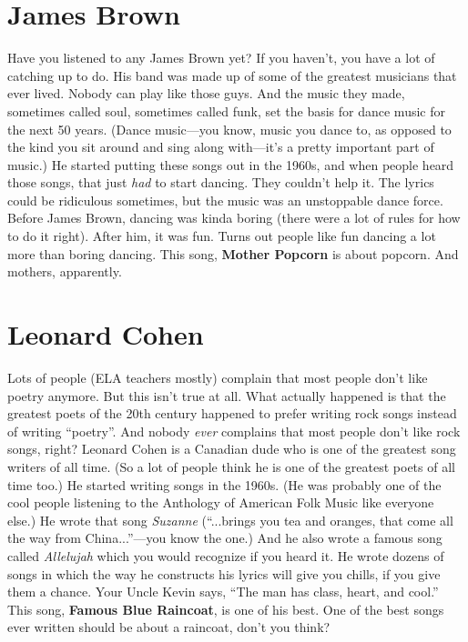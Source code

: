 \documentclass[letterpaper,single]{article}
\begin{document}
\section{James Brown}
Have you listened to any James Brown yet? 
If you haven't, you have a lot of catching up to do. 
His band was made up of some of the greatest musicians that ever lived. 
Nobody can play like those guys. 
And the music they made, sometimes called soul, sometimes called funk, set the basis for dance music for the next 50 years. 
(Dance music---you know, music you dance to, as opposed to the kind you sit around and sing along with---it's a pretty important part of music.) 
He started putting these songs out in the 1960s, and when people heard those songs, that just \emph{had} to start dancing. 
They couldn't help it. 
The lyrics could be ridiculous sometimes, but the music was an unstoppable dance force.
Before James Brown, dancing was kinda boring (there were a lot of rules for how to do it right). 
After him, it was fun. 
Turns out people like fun dancing a lot more than boring dancing.
This song, \textbf{Mother Popcorn} is about popcorn. And mothers, apparently.

\section{Leonard Cohen}
Lots of people (ELA teachers mostly) complain that most people don't like poetry anymore. 
But this isn't true at all. 
What actually happened is that the greatest poets of the 20th century happened to prefer writing rock songs instead of writing ``poetry''. 
And nobody \emph{ever} complains that most people don't like rock songs, right? 
Leonard Cohen is a Canadian dude who is one of the greatest song writers of all time. 
(So a lot of people think he is one of the greatest poets of all time too.) 
He started writing songs in the 1960s. 
(He was probably one of the cool people listening to the Anthology of American Folk Music like everyone else.) 
He wrote that song \emph{Suzanne} (``...brings you tea and oranges, that come all the way from China...''---you know the one.) 
And he also wrote a famous song called \emph{Allelujah} which you would recognize if you heard it. 
He wrote dozens of songs in which the way he constructs his lyrics will give you chills, if you give them a chance. 
Your Uncle Kevin says, ``The man has class, heart, and cool.''
This song, \textbf{Famous Blue Raincoat}, is one of his best.
One of the best songs ever written should be about a raincoat, don't you think?
\end{document}
